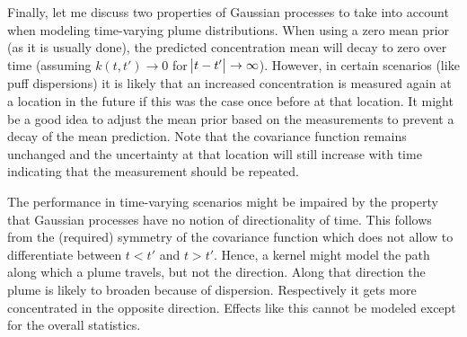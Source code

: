Finally, let me discuss two properties of Gaussian processes to take into 
account when modeling time-varying plume distributions. When using a zero mean 
prior (as it is usually done), the predicted concentration mean will decay to 
zero over time (assuming $k(t, t') \rightarrow 0$ for $\abs{t - t'} \rightarrow 
\infty$). However, in certain scenarios (like puff dispersions) it is likely 
that an increased concentration is measured again at a location in the future if 
this was the case once before at that location. It might be a good idea to 
adjust the mean prior based on the measurements to prevent a decay of the mean 
prediction.  Note that the covariance function remains unchanged and the 
uncertainty at that location will still increase with time indicating that the 
measurement should be repeated.

The performance in time-varying scenarios might be impaired by the property that 
Gaussian processes have no notion of directionality of time. This follows from 
the (required) symmetry of the covariance function which does not allow to 
differentiate between $t < t'$ and $t > t'$. Hence, a kernel might model the 
path along which a plume travels, but not the direction. Along that direction 
the plume is likely to broaden because of dispersion. Respectively it gets more 
concentrated in the opposite direction. Effects like this cannot be modeled 
except for the overall statistics.
